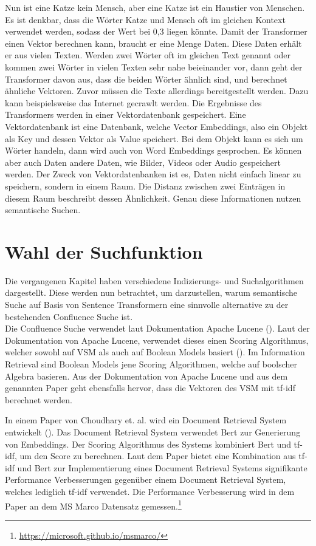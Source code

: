 Nun ist eine Katze kein Mensch, aber eine Katze ist ein Haustier von Menschen.
Es ist denkbar, dass die Wörter Katze und Mensch oft im gleichen Kontext verwendet werden, sodass der Wert bei 0,3 liegen könnte.
Damit der Transformer einen Vektor berechnen kann, braucht er eine Menge Daten.
Diese Daten erhält er aus vielen Texten.
Werden zwei Wörter oft im gleichen Text genannt oder kommen zwei Wörter in vielen Texten sehr nahe beieinander vor, dann geht der Transformer davon aus, dass die beiden Wörter ähnlich sind, und berechnet ähnliche Vektoren.
Zuvor müssen die Texte allerdings bereitgestellt werden.
Dazu kann beispielsweise das Internet gecrawlt werden.
Die Ergebnisse des Transformers werden in einer Vektordatenbank gespeichert.
Eine Vektordatenbank ist eine Datenbank, welche Vector Embeddings, also ein Objekt als Key und dessen Vektor als Value speichert.
Bei dem Objekt kann es sich um Wörter handeln, dann wird auch von Word Embeddings gesprochen.
Es können aber auch Daten andere Daten, wie Bilder, Videos oder Audio gespeichert werden.
Der Zweck von Vektordatenbanken ist es, Daten nicht einfach linear zu speichern, sondern in einem Raum.
Die Distanz zwischen zwei Einträgen in diesem Raum beschreibt dessen Ähnlichkeit.
Genau diese Informationen nutzen semantische Suchen.

\section{Wahl der Suchfunktion}

Die vergangenen Kapitel haben verschiedene Indizierungs- und Suchalgorithmen dargestellt.
Diese werden nun betrachtet, um darzustellen, warum semantische Suche auf Basis von Sentence Transformern eine sinnvolle alternative zu der bestehenden Confluence Suche ist.\\

Die Confluence Suche verwendet laut Dokumentation Apache Lucene (\cite{Confluence_Ranking}).
Laut der Dokumentation von Apache Lucene, verwendet dieses einen Scoring Algorithmus, welcher sowohl auf VSM als auch auf Boolean Models basiert (\cite{Lucene_Scoring}).
Im Information Retrieval sind Boolean Models jene Scoring Algorithmen, welche auf boolscher Algebra basieren.
Aus der Dokumentation von Apache Lucene und aus dem genannten Paper geht ebensfalls hervor, dass die Vektoren des VSM mit tf-idf berechnet werden.

In einem Paper von Choudhary et. al. wird ein Document Retrieval System entwickelt (\cite{Choudhary_Guttikonda_Chowdhury_Learmonth_2020}).
Das Document Retrieval System verwendet Bert zur Generierung von Embeddings.
Der Scoring Algorithmus des Systems kombiniert Bert und tf-idf, um den Score zu berechnen.
Laut dem Paper bietet eine Kombination aus tf-idf und Bert zur Implementierung eines Document Retrieval Systems signifikante Performance Verbesserungen gegenüber einem Document Retrieval System, welches lediglich tf-idf verwendet.
Die Performance Verbesserung wird in dem Paper an dem MS Marco Datensatz gemessen.\footnote{\url{https://microsoft.github.io/msmarco/}}\\

